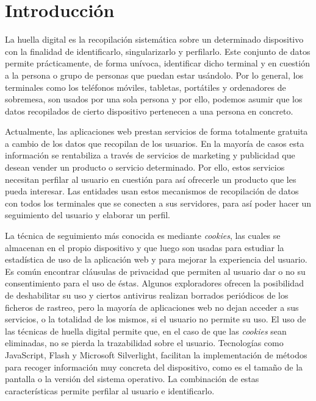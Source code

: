 \chapter{Introducción}

La huella digital es la recopilación sistemática sobre un determinado dispositivo con la finalidad de identificarlo, singularizarlo y perfilarlo. Este conjunto de datos permite prácticamente, de forma unívoca, identificar dicho terminal y en cuestión a la persona o grupo de personas que puedan estar usándolo. Por lo general, los terminales como los teléfonos móviles, tabletas, portátiles y ordenadores de sobremesa, son usados por una sola persona y por ello, podemos asumir que los datos recopilados de cierto dispositivo pertenecen a una persona en concreto.\par

Actualmente, las aplicaciones web prestan servicios de forma totalmente gratuita a cambio de los datos que recopilan de los usuarios. En la mayoría de casos esta información se rentabiliza a través de servicios de marketing y publicidad que desean vender un producto o servicio determinado. Por ello, estos servicios necesitan perfilar al usuario en cuestión para así ofrecerle un producto que les pueda interesar. Las entidades usan estos mecanismos de recopilación de datos con todos los terminales que se conecten a sus servidores, para así poder hacer un seguimiento del usuario y elaborar un perfil.\par

La técnica de seguimiento más conocida es mediante \textit{cookies}, las cuales se almacenan en el propio dispositivo y que luego son usadas para estudiar la estadística de uso de la aplicación web y para mejorar la experiencia del usuario. Es común encontrar cláusulas de privacidad que permiten al usuario dar o no su consentimiento para el uso de éstas. Algunos exploradores ofrecen la posibilidad de deshabilitar su uso y ciertos antivirus realizan borrados periódicos de los ficheros de rastreo, pero la mayoría de aplicaciones web no dejan acceder a sus servicios, o la totalidad de los mismos, si el usuario no permite su uso. El uso de las técnicas de huella digital permite que, en el caso de que las \textit{cookies} sean eliminadas, no se pierda la trazabilidad sobre el usuario. Tecnologías como JavaScript, Flash y Microsoft Silverlight, facilitan la implementación de métodos para recoger información muy concreta del dispositivo, como es el tamaño de la pantalla o la versión del sistema operativo. La combinación de estas características permite perfilar al usuario e identificarlo.  \par

